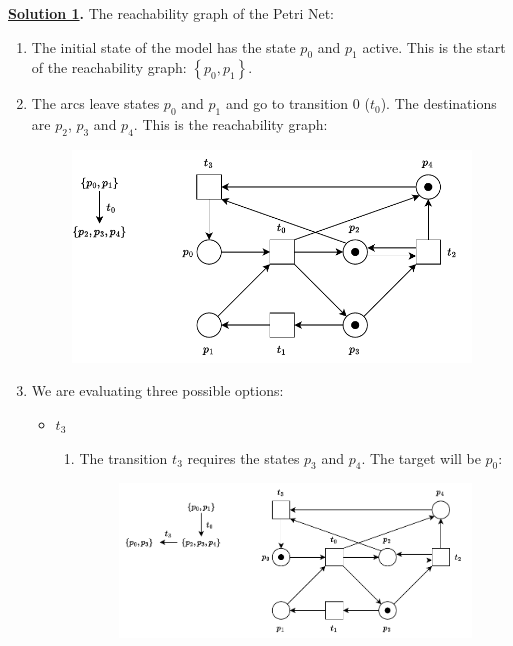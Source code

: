 \solution
\textbf{\underline{Solution 1}.} The reachability graph of the Petri Net:
\begin{enumerate}
    \item The initial state of the model has the state $p_0$ and $p_1$ active. This is the start of the reachability graph: $\left\{p_0, p_1\right\}$.

    \item The arcs leave states $p_0$ and $p_1$ and go to transition 0 ($t_0$). The destinations are $p_2$, $p_3$ and $p_4$. This is the reachability graph:
    \begin{figure}[!htp]
        \centering
        \includegraphics[width=.85\textwidth]{img/reachability-graph-2.pdf}
    \end{figure}

    \newpage

    \item We are evaluating three possible options:
    \begin{itemize}
        \item $t_3$
        \begin{enumerate}
            \item The transition $t_3$ requires the states $p_3$ and $p_4$. The target will be $p_0$:
            \begin{figure}[!htp]
                \centering
                \includegraphics[width=\textwidth]{img/reachability-graph-3.pdf}
            \end{figure}


\end{enumerate}
\end{itemize}
\end{enumerate}
